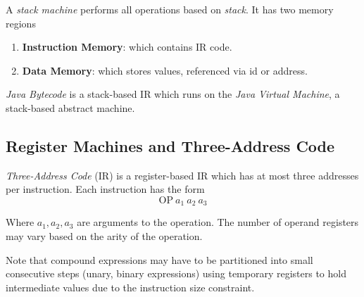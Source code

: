 \begin{definition}
    A \textit{stack machine} performs all operations based on \textit{stack}. It has two memory regions
    \begin{enumerate}
        \item \textbf{Instruction Memory}: which contains IR code.
        \item \textbf{Data Memory}: which stores values, referenced via id or address.
    \end{enumerate}
\end{definition}

\begin{example}
    \textit{Java Bytecode} is a stack-based IR which runs on the \textit{Java Virtual Machine}, a stack-based abstract machine.
\end{example}

\subsection{Register Machines and Three-Address Code}

\begin{definition}
    \textit{Three-Address Code} (IR) is a register-based IR which has at most three addresses per instruction. Each instruction has the form
    \begin{equation}
        \mathrm{OP}\ a_{1}\ a_{2}\ a_{3}
    \end{equation}
    
    Where $a_1, a_2, a_3$ are arguments to the operation. The number of operand registers may vary based on the arity of the operation.
    
    Note that compound expressions may have to be partitioned into small consecutive steps (unary, binary expressions) using temporary registers to hold intermediate values due to the instruction size constraint.
\end{definition}

